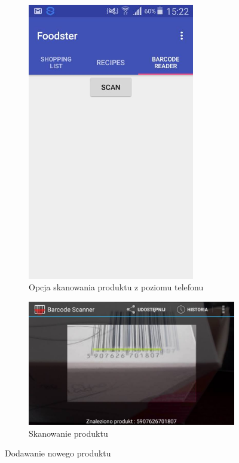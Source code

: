 \documentclass{article}
\begin{document}
\begin{figure}[!ht]
\begin{subfigure}{.3\textwidth}
\includegraphics[width=0.8\textwidth]{barcode1}\par\vspace{1cm}
  \caption{Opcja skanowania produktu z poziomu telefonu}
  \label{fig:sub1}
\end{subfigure}%
\begin{subfigure}{.3\textwidth}
  \centering
\includegraphics[width=1\textwidth]{barcode3}\par\vspace{1cm}
  \caption{Skanowanie produktu}
  \label{fig:sub1}
\end{subfigure}%
  \caption{Dodawanie nowego produktu}
\end{figure}
\end{document}
